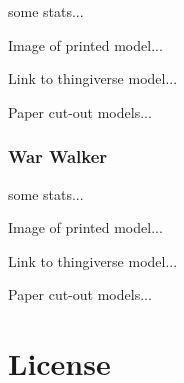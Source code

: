 \documentclass{article}
\begin{document}
some stats...

Image of printed model...

Link to thingiverse model...

Paper cut-out models...

\subsubsection{War Walker}

some stats...

Image of printed model...

Link to thingiverse model...

Paper cut-out models...

\section{License}
\end{document}

